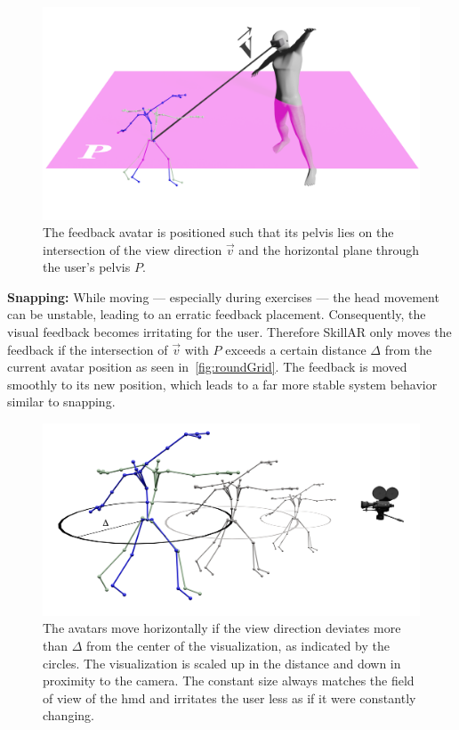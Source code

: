 \begin{figure}[h!]
	\centering
	\includegraphics[width=0.6\linewidth]{pictures/avatarPos.png}
	\caption[Positioning of the feedback avatar.]{The feedback avatar is positioned such that its pelvis lies on the intersection of the view direction $\vec{v}$ and the horizontal plane through the user's pelvis $P$.\label{fig:positioning}}
\end{figure}

\textbf{Snapping:}
While moving --- especially during exercises --- the head movement can be unstable, leading to an erratic feedback placement. Consequently, the visual feedback becomes irritating for the user. Therefore SkillAR only moves the feedback if the intersection of $\vec{v}$ with $P$ exceeds a certain distance $\Delta$ from the current avatar position as seen in~\autoref{fig:roundGrid}. The feedback is moved smoothly to its new position, which leads to a far more stable system behavior similar to snapping.

\begin{figure}[h!]
	\centering
	\includegraphics[width=0.6\linewidth]{pictures/gridRound.png}
	\caption[Spatial stabilization of the feedback positioning.]{The avatars move horizontally if the view direction deviates more than $\Delta$ from the center of the visualization, as indicated by the circles. The visualization is scaled up in the distance and down in proximity to the camera. The constant size always matches the field of view of the \acrshort{hmd} and irritates the user less as if it were constantly changing.\label{fig:roundGrid}}
\end{figure}

